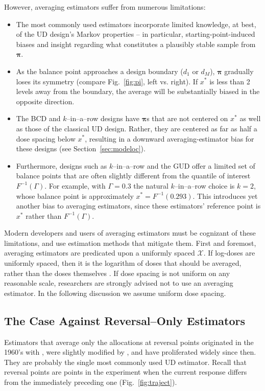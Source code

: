 However, averaging estimators suffer from numerous limitations:
%
\begin{itemize}
\item The most commonly used estimators incorporate limited knowledge, at best, of the UD design's Markov properties -- in particular, starting-point-induced biases and insight regarding what constitutes a plausibly stable sample from $\boldsymbol{\pi}$.
\item As the balance point  approaches a design boundary ($d_1$ or $d_M$), $\boldsymbol{\pi}$ gradually loses its symmetry (compare Fig.~\ref{fig:pi}, left vs. right).  If  $x^*$ is less than 2 levels away from the boundary, the average will be substantially biased in the opposite direction.
\item The BCD and $k$--in--a--row designs have $\boldsymbol{\pi}$s that are not centered on $x^*$ as well as those of the classical UD design. Rather, they are centered as far as half a dose spacing below $x^*$, resulting in a downward averaging-estimator bias for these designs (see Section~\ref{sec:modeloc}).
\item Furthermore, designs such as $k$--in--a--row and the GUD offer a limited set of balance points that are often slightly different from the quantile of interest $F^{-1}(\Gamma)$. For example, with $\Gamma=0.3$ the natural $k$--in--a--row choice is $k=2$, whose balance point is approximately $x^*=F^{-1}(0.293)$. This introduces yet another bias to averaging estimators, since these estimators' reference point is $x^*$ rather than $F^{-1}(\Gamma)$.
\end{itemize}
%
Modern developers and users of averaging estimators must be cognizant of these limitations, and use estimation methods that mitigate them. First and foremost, averaging estimators are predicated upon a uniformly spaced $\mathcal{X}$. If log-doses are uniformly spaced, then it is the logarithm of doses that should be averaged, rather than the doses themselves \citep{Garc:Pere:Forc:1998,Oron07}. If dose spacing is not uniform on any reasonable scale, researchers are strongly advised not to use an averaging estimator. In the following discussion we assume uniform dose spacing.

\subsection{The Case Against Reversal--Only Estimators}

Estimators that average only the allocations at reversal points originated in the 1960's with \cite{Weth:Chen:Vasu:est:1966}, were slightly modified by \cite{Choi:est:1971}, and have proliferated widely since then. They are probably the single most commonly used UD estimator. Recall that reversal points are points in the experiment when the current response differs from the immediately preceding one (Fig.~\ref{fig:traject}).

